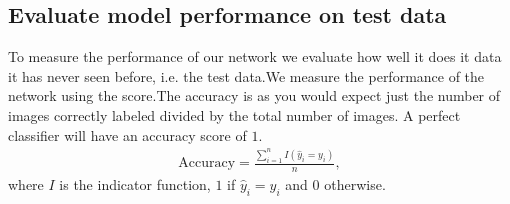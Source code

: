 \documentclass[letterpaper,10pt,english]{sphinxmanual}
\begin{document}
\begin{sphinxVerbatim}[commandchars=\\\{\}]
                  \PYG{p}{[}\PYG{p}{]}
                  \PYG{p}{[}\PYG{p}{]}

\end{sphinxVerbatim}


\subsection{Evaluate model performance on test data}
\label{\detokenize{chapter6:evaluate-model-performance-on-test-data}}
To measure the performance of our network we evaluate how well it does it data it has never seen before, i.e. the test data.We measure the performance of the network using the  score.The accuracy is as you would expect just the number of images correctly labeled divided by the total number of images. A perfect classifier will have an accuracy score of \(1\).
\begin{equation*}
\begin{split} \text{Accuracy} = \frac{\sum_{i=1}^n I(\hat{y}_i = y_i)}{n} ,\end{split}
\end{equation*}
where \(I\) is the indicator function, \(1\) if \(\hat{y}_i = y_i\) and \(0\) otherwise.
\end{document}
